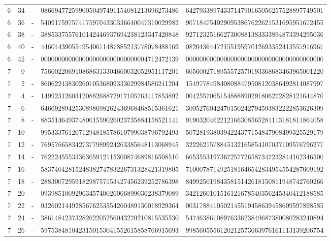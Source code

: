 \begin{longtable}{rrrll}
6 & 34 & - & 0866947725990050497491154081213696273486 & 6427933897433714790165056257528897749501 \\
6 & 36 & - & 5409175975741759704330336640047310029982 & 9071847540290953867622621531695951672455 \\
6 & 38 & - & 3885337557610142446937694238123347420848 & 9271232516627300881383333894873394295036 \\
6 & 40 & - & 4460443905549540671487885213778078488169 & 0820436447215519597012693352413557916967 \\
6 & 42 & - & 0000000000000000000000000000004712472139 & 0000000000000000000000000000000000000000 \\
7 & 0 & - & 7566022069108686313304660032052951117201 & 6056002718955572570193368683463965001220 \\
7 & 2 & - & 8606224383026010536809333629984586241204 & 1549778498408088479508120386492814087997 \\
7 & 4 & - & 1499231260312088268872917105763417853892 & 0042557065154888890291806272828121644870 \\
7 & 6 & - & 6466928942530898698262436968468515361621 & 3005276042470150242794593832222853626309 \\
7 & 8 & - & 8835146493748061559026023735884158521141 & 9190320462212166308565281113181811864058 \\
7 & 10 & - & 9953337612071294818578610799038796792493 & 5072819380394224377154847908499325529179 \\
7 & 12 & - & 7695766583427377989924263385648113068945 & 3222621578845132165854107037109576796277 \\
7 & 14 & - & 7622245553336305912115300874689816508510 & 6653553197367257726587347232844162346500 \\
7 & 16 & - & 5837404281524838274783226731328421319805 & 7100078714925181646542834954554287609192 \\
7 & 18 & - & 2883007295918298757153427456239252786398 & 8499250198435815142618150811948742760266 \\
7 & 20 & - & 0939851009296345740026066899036238379089 & 3421260101516121678540356245340412188585 \\
7 & 22 & - & 0326021449285676253554260489130018929364 & 0031788410502145519458639458609597898585 \\
7 & 24 & - & 3861484237328262205256043270210815535530 & 5474638610897633623849687380080283240894 \\
7 & 26 & - & 5975384810423150153041552615858766915693 & 9985605556120212573663976161113139206754 \\

\end{longtable}
